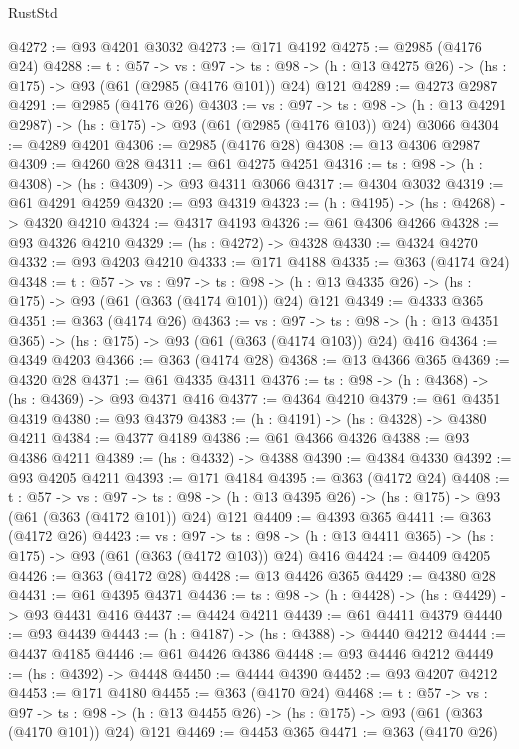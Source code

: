 \begin{lexlean}{RustStd}
\begin{coremodule}
@4272 := @93 @4201 @3032
@4273 := @171 @4192
@4275 := @2985 (@4176 @24)
@4288 := {t : @57} ->
  {vs : @97} ->
  {ts : @98} -> (h : @13 @4275 @26) -> (hs : @175) -> @93 (@61 (@2985 (@4176 @101)) @24) @121
@4289 := @4273 @2987
@4291 := @2985 (@4176 @26)
@4303 := {vs : @97} ->
  {ts : @98} -> (h : @13 @4291 @2987) -> (hs : @175) -> @93 (@61 (@2985 (@4176 @103)) @24) @3066
@4304 := @4289 @4201
@4306 := @2985 (@4176 @28)
@4308 := @13 @4306 @2987
@4309 := @4260 @28
@4311 := @61 @4275 @4251
@4316 := {ts : @98} -> (h : @4308) -> (hs : @4309) -> @93 @4311 @3066
@4317 := @4304 @3032
@4319 := @61 @4291 @4259
@4320 := @93 @4319
@4323 := (h : @4195) -> (hs : @4268) -> @4320 @4210
@4324 := @4317 @4193
@4326 := @61 @4306 @4266
@4328 := @93 @4326 @4210
@4329 := (hs : @4272) -> @4328
@4330 := @4324 @4270
@4332 := @93 @4203 @4210
@4333 := @171 @4188
@4335 := @363 (@4174 @24)
@4348 := {t : @57} ->
  {vs : @97} ->
  {ts : @98} -> (h : @13 @4335 @26) -> (hs : @175) -> @93 (@61 (@363 (@4174 @101)) @24) @121
@4349 := @4333 @365
@4351 := @363 (@4174 @26)
@4363 := {vs : @97} ->
  {ts : @98} -> (h : @13 @4351 @365) -> (hs : @175) -> @93 (@61 (@363 (@4174 @103)) @24) @416
@4364 := @4349 @4203
@4366 := @363 (@4174 @28)
@4368 := @13 @4366 @365
@4369 := @4320 @28
@4371 := @61 @4335 @4311
@4376 := {ts : @98} -> (h : @4368) -> (hs : @4369) -> @93 @4371 @416
@4377 := @4364 @4210
@4379 := @61 @4351 @4319
@4380 := @93 @4379
@4383 := (h : @4191) -> (hs : @4328) -> @4380 @4211
@4384 := @4377 @4189
@4386 := @61 @4366 @4326
@4388 := @93 @4386 @4211
@4389 := (hs : @4332) -> @4388
@4390 := @4384 @4330
@4392 := @93 @4205 @4211
@4393 := @171 @4184
@4395 := @363 (@4172 @24)
@4408 := {t : @57} ->
  {vs : @97} ->
  {ts : @98} -> (h : @13 @4395 @26) -> (hs : @175) -> @93 (@61 (@363 (@4172 @101)) @24) @121
@4409 := @4393 @365
@4411 := @363 (@4172 @26)
@4423 := {vs : @97} ->
  {ts : @98} -> (h : @13 @4411 @365) -> (hs : @175) -> @93 (@61 (@363 (@4172 @103)) @24) @416
@4424 := @4409 @4205
@4426 := @363 (@4172 @28)
@4428 := @13 @4426 @365
@4429 := @4380 @28
@4431 := @61 @4395 @4371
@4436 := {ts : @98} -> (h : @4428) -> (hs : @4429) -> @93 @4431 @416
@4437 := @4424 @4211
@4439 := @61 @4411 @4379
@4440 := @93 @4439
@4443 := (h : @4187) -> (hs : @4388) -> @4440 @4212
@4444 := @4437 @4185
@4446 := @61 @4426 @4386
@4448 := @93 @4446 @4212
@4449 := (hs : @4392) -> @4448
@4450 := @4444 @4390
@4452 := @93 @4207 @4212
@4453 := @171 @4180
@4455 := @363 (@4170 @24)
@4468 := {t : @57} ->
  {vs : @97} ->
  {ts : @98} -> (h : @13 @4455 @26) -> (hs : @175) -> @93 (@61 (@363 (@4170 @101)) @24) @121
@4469 := @4453 @365
@4471 := @363 (@4170 @26)

\end{coremodule}
\end{lexlean}

